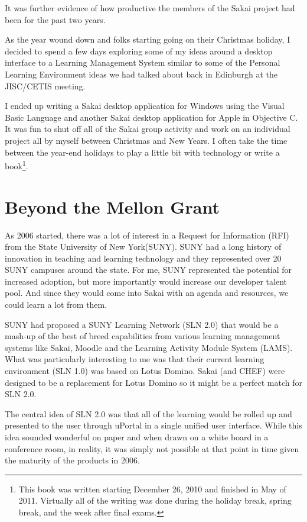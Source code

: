 \documentclass[12pt]{book}
\begin{document}
It was further evidence of how productive the members
of the Sakai project had been for the past two years.


As the year wound down and folks starting going on their Christmas
holiday, I decided to spend a few days exploring some of my
ideas around a desktop interface to a Learning Management
System similar to some of the Personal Learning Environment
ideas we had talked about back in Edinburgh at the JISC\slash CETIS meeting.

I ended up writing a Sakai desktop application for Windows
using the Visual Basic Language and another Sakai desktop
application for Apple in Objective C.   It was fun to
shut off all of the Sakai group activity and work on an individual
project all by myself between Christmas and New Years.  I often take the
time between the year-end holidays to play a little bit with
technology or write a book\footnote{This book was written starting
December 26, 2010 and finished in May of 2011.  Virtually all
of the writing was done during the holiday break, spring break,
and the week after final exams.}.

\chapter{Beyond the Mellon Grant}

As 2006 started, there was a lot of interest in a Request for
Information (RFI) from the State University of
New York(SUNY).  SUNY had a long history of innovation in
teaching and learning technology and they represented
over 20 SUNY campuses around
the state.   For me, SUNY represented the potential for
increased adoption, but more importantly would increase our
developer talent pool.   And since they would come into Sakai
with an agenda and resources, we could learn a lot from them.

SUNY had proposed a SUNY Learning Network (SLN 2.0) that would be
a mash-up of the best of breed capabilities from various
learning management systems like Sakai, Moodle and the Learning
Activity Module System (LAMS).   What was particularly interesting
to me was that their current learning environment (SLN 1.0)
was based on Lotus Domino.  Sakai (and CHEF) were designed
to be a replacement for Lotus Domino so it might be a perfect
match for SLN 2.0.

The central idea of SLN 2.0 was that all of the learning would
be rolled up and presented to the user through uPortal in a single
unified user interface.  While this idea sounded wonderful on
paper and when drawn on a white board in a conference room, in
reality, it was simply not possible at that point in time given
the maturity of the products in 2006.
\end{document}
